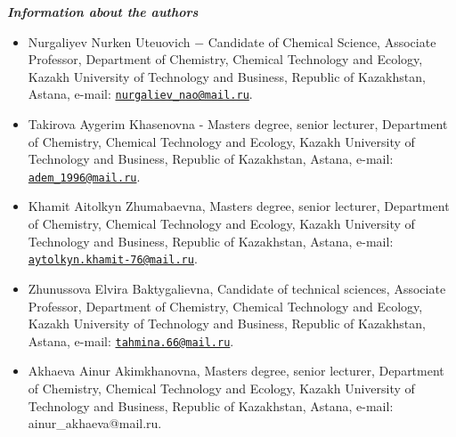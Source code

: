\emph{{\bfseries Information about the authors}}


\begin{itemize}
\item
Nurgaliyev Nurken Uteuovich − Candidate of Chemical Science, Associate
Professor, Department of Chemistry, Chemical Technology and Ecology,
Kazakh University of Technology and Business, Republic of Kazakhstan,
Astana, e-mail:
\href{mailto:nurgaliev_nao@mail.ru}{\nolinkurl{nurgaliev\_nao@mail.ru}}.

\item
Takirova Aygerim Khasenovna - Master\textquotesingle s degree, senior
lecturer, Department of Chemistry, Chemical Technology and Ecology,
Kazakh University of Technology and Business, Republic of Kazakhstan,
Astana, e-mail:
\href{mailto:adem_1996@mail.ru}{\nolinkurl{adem\_1996@mail.ru}}.

\item
Khamit Aitolkyn Zhumabaevna, Master\textquotesingle s degree, senior
lecturer, Department of Chemistry, Chemical Technology and Ecology,
Kazakh University of Technology and Business, Republic of Kazakhstan,
Astana, e-mail:
\href{mailto:aytolkyn.khamit-76@mail.ru}{\nolinkurl{aytolkyn.khamit-76@mail.ru}}.

\item
Zhunussova Elvira Baktygalievna, Candidate of technical sciences,
Associate Professor, Department of Chemistry, Chemical Technology and
Ecology, Kazakh University of Technology and Business, Republic of
Kazakhstan, Astana, e-mail:
\href{mailto:tahmina.66@mail.ru}{\nolinkurl{tahmina.66@mail.ru}}.

\item
Akhaeva Ainur Akimkhanovna, Master\textquotesingle s degree, senior
lecturer, Department of Chemistry, Chemical Technology and Ecology,
Kazakh University of Technology and Business, Republic of Kazakhstan,
Astana, e-mail: ainur\_akhaeva@mail.ru.
\end{itemize}
